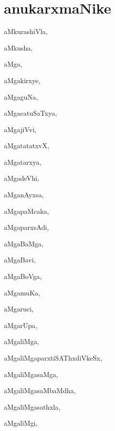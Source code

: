 \chapter*{anukarxmaNike}


\begin{multicols}{3}
{\small

\noindent
{}
\smallskip

\noindent
{aMkurashiVla}, \pageref{aMkurashiVla}

\noindent
{aMkusha}, \pageref{aMkusha}

\noindent
{aMga}, \pageref{aMga}

\noindent
{aMgakirxye}, \pageref{aMgakirxye}

\noindent
{aMgaguNa}, \pageref{aMgaguNa}

\noindent
{aMgacatuSaTxya}, \pageref{aMgacatuSaTxya}

\noindent
{aMgajiVvi}, \pageref{aMgajiVvi}

\noindent
{aMgatatatxvX}, \pageref{aMgatatatxvX}

\noindent
{aMgatarxya}, \pageref{aMgatarxya}

\noindent
{aMgadeVhi}, \pageref{aMgadeVhi}

\noindent
{aMganAyxsa}, \pageref{aMganAyxsa}

\noindent
{aMgapaMcaka}, \pageref{aMgapaMcaka}

\noindent
{aMgaparxsAdi}, \pageref{aMgaparxsAdi}

\noindent
{aMgaBaMga}, \pageref{aMgaBaMga}

\noindent
{aMgaBavi}, \pageref{aMgaBavi}

\noindent
{aMgaBoVga}, \pageref{aMgaBoVga}

\noindent
{aMgamuKa}, \pageref{aMgamuKa}

\noindent
{aMgaruci}, \pageref{aMgaruci}

\noindent
{aMgarUpa}, \pageref{aMgarUpa}

\noindent
{aMgaliMga}, \pageref{aMgaliMga}

\noindent
{aMgaliMgaparxtiSAThxdiVkeSx}, \pageref{aMgaliMgaparxtiSAThxdiVkeSx}

\noindent
{aMgaliMgasaMga}, \pageref{aMgaliMgasaMga}

\noindent
{aMgaliMgasaMbaMdha}, \pageref{aMgaliMgasaMbaMdha}

\noindent
{aMgaliMgasathxla}, \pageref{aMgaliMgasathxla}

\noindent
{aMgaliMgi}, \pageref{aMgaliMgi}

}
\end{multicols}
